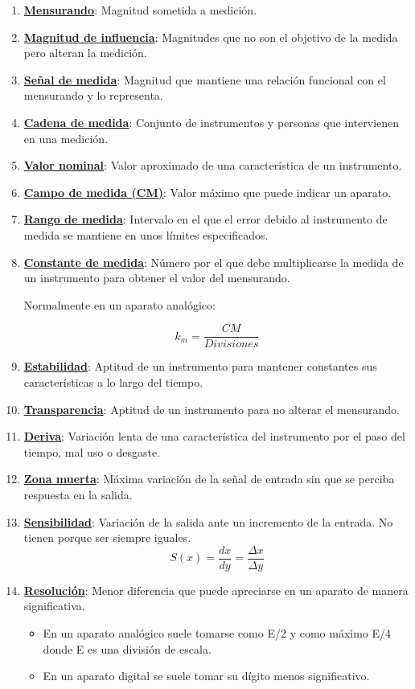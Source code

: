\begin{enumerate}
	\item \underline{\textbf{Mensurando}}: Magnitud sometida a medición.
	\item \underline{\textbf{Magnitud de influencia}}: Magnitudes que no son el objetivo de la medida pero alteran la medición.
	\item \underline{\textbf{Señal de medida}}: Magnitud que mantiene una relación funcional con el mensurando y lo representa.
	\item \underline{\textbf{Cadena de medida}}: Conjunto de instrumentos y personas que intervienen en una medición.
	\item \underline{\textbf{Valor nominal}}: Valor aproximado de una característica de un instrumento. 
	\item \underline{\textbf{Campo de medida (CM)}}: Valor máximo que puede indicar un aparato.
	\item \underline{\textbf{Rango de medida}}: Intervalo en el que el error debido al instrumento de medida se mantiene en unos límites especificados.
	\item \underline{\textbf{Constante de medida}}: Número por el que debe multiplicarse la medida de un instrumento para obtener el valor del mensurando. 
	\begin{center} 	Normalmente en un aparato analógico:\end{center}
		\[ k_m = \frac{CM}{Divisiones} \]
	\item \underline{\textbf{Estabilidad}}: Aptitud de un instrumento para mantener constantes sus características a lo largo del tiempo.
	\item \underline{\textbf{Transparencia}}: Aptitud de un instrumento para no alterar el mensurando.
	\item \underline{\textbf{Deriva}}: Variación lenta de una característica del instrumento por el paso del tiempo, mal uso o desgaste.
	\item \underline{\textbf{Zona muerta}}: Máxima variación de la señal de entrada sin que se perciba respuesta en la salida.
	\item \underline{\textbf{Sensibilidad}}: Variación de la salida ante un incremento de la entrada. No tienen porque ser siempre iguales.
	\[ S(x) = \dfrac{dx}{dy}=\dfrac{\Delta x}{\Delta y} \]
	\item \underline{\textbf{Resolución}}: Menor diferencia que puede apreciarse en un aparato de manera significativa.
	\begin{itemize}
	 \item En un aparato analógico suele tomarse como E/2 y como máximo E/4 donde E es una división de escala.
	 \item En un aparato digital se suele tomar su dígito menos significativo.
	\end{itemize}
	

\end{enumerate}

